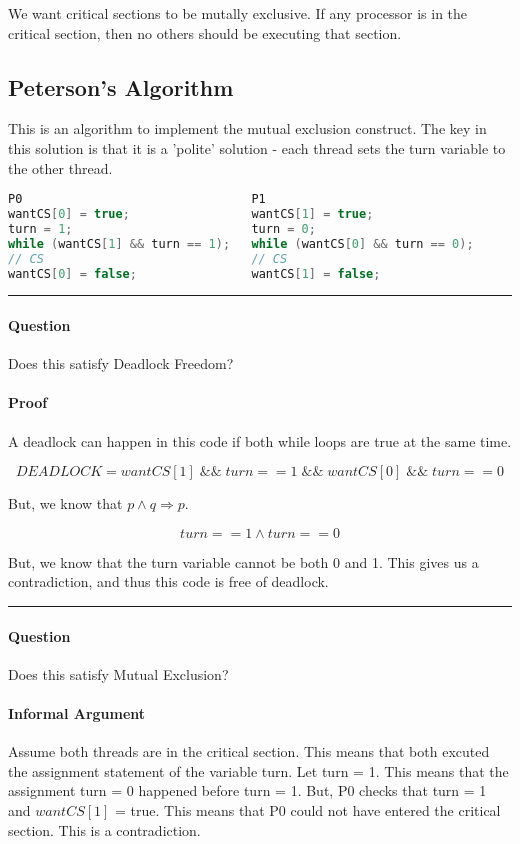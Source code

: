 \documentclass[twoside]{article}
\begin{document}
We want critical sections to be mutally exclusive. If any processor is in the critical section, then no others should be executing that section.

\subsection{Peterson's Algorithm}
This is an algorithm to implement the mutual exclusion construct. The key in this solution is that it is a 'polite' solution - each thread sets the turn variable to the other thread.

\begin{lstlisting}[language=Java]
               P0                                P1
wantCS[0] = true;                 wantCS[1] = true;
turn = 1;                         turn = 0;
while (wantCS[1] && turn == 1);   while (wantCS[0] && turn == 0);
// CS                             // CS
wantCS[0] = false;                wantCS[1] = false;
\end{lstlisting}

\rule{\linewidth}{0.2pt}

\paragraph{Question}
Does this satisfy Deadlock Freedom?
\paragraph{Proof}
A deadlock can happen in this code if both while loops are true at the same time.

$$DEADLOCK = wantCS[1]\; \&\&\; turn == 1\; \&\&\; wantCS[0]\; \&\&\; turn == 0$$

But, we know that $p \land q \Rightarrow p$.

$$turn == 1 \land turn == 0$$

But, we know that the turn variable cannot be both 0 and 1. This gives us a contradiction, and thus this code is free of deadlock.

\rule{\linewidth}{0.2pt}

\paragraph{Question}
Does this satisfy Mutual Exclusion?
\paragraph{Informal Argument}
Assume both threads are in the critical section. This means that both excuted the assignment statement of the variable turn. Let turn = 1. This means that the assignment turn = 0 happened before turn = 1. But, P0 checks that turn = 1 and $wantCS[1]$ = true. This means that P0 could not have entered the critical section. This is a contradiction.
\end{document}
